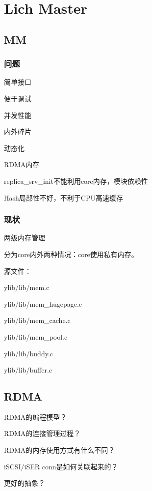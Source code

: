 \chapter{Lich Master}

\section{MM}

\subsection{问题}

\begin{enumbox}
\item 简单接口
\item 便于调试
\item 并发性能
\item 内外碎片
\item 动态化
\item RDMA内存
\item replica\_srv\_init不能利用core内存，模块依赖性
\item Hash局部性不好，不利于CPU高速缓存
\end{enumbox}

\subsection{现状}

两级内存管理

分为core内外两种情况：core使用私有内存。

源文件：
\begin{enumbox}
\item ylib/lib/mem.c
\item ylib/lib/mem\_hugepage.c
\item ylib/lib/mem\_cache.c
\item ylib/lib/mem\_pool.c
\item ylib/lib/buddy.c
\item ylib/lib/buffer.c
\end{enumbox}

\section{RDMA}

\begin{enumbox}
\item RDMA的编程模型？
\item RDMA的连接管理过程？
\item RDMA的内存使用方式有什么不同？
\item iSCSI/iSER conn是如何关联起来的？
\item 更好的抽象？
\end{enumbox}

